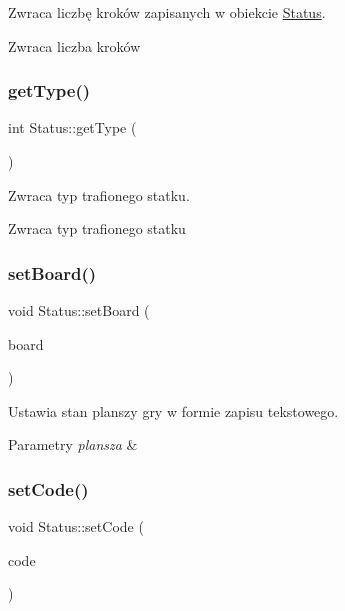 Zwraca liczbę kroków zapisanych w obiekcie \mbox{\hyperlink{classStatus}{Status}}. 

\begin{DoxyReturn}{Zwraca}
liczba kroków 
\end{DoxyReturn}
\mbox{\label{classStatus_a340935e3e450c18898a9f676b75be4e3}} 
\subsubsection{\texorpdfstring{getType()}{getType()}}
{\footnotesize\ttfamily int Status\+::get\+Type (\begin{DoxyParamCaption}{ }\end{DoxyParamCaption})}



Zwraca typ trafionego statku. 

\begin{DoxyReturn}{Zwraca}
typ trafionego statku 
\end{DoxyReturn}
\mbox{\label{classStatus_a562a7e93719368a0158535853b58b9cf}} 
\subsubsection{\texorpdfstring{setBoard()}{setBoard()}}
{\footnotesize\ttfamily void Status\+::set\+Board (\begin{DoxyParamCaption}\item[{Q\+String}]{board }\end{DoxyParamCaption})}



Ustawia stan planszy gry w formie zapisu tekstowego. 


\begin{DoxyParams}{Parametry}
{\em plansza} & \\
\hline
\end{DoxyParams}
\mbox{\label{classStatus_a19c2b6fa24bc5f22f919a272e9fb9898}} 
\subsubsection{\texorpdfstring{setCode()}{setCode()}}
{\footnotesize\ttfamily void Status\+::set\+Code (\begin{DoxyParamCaption}\item[{Q\+String}]{code }\end{DoxyParamCaption})}



